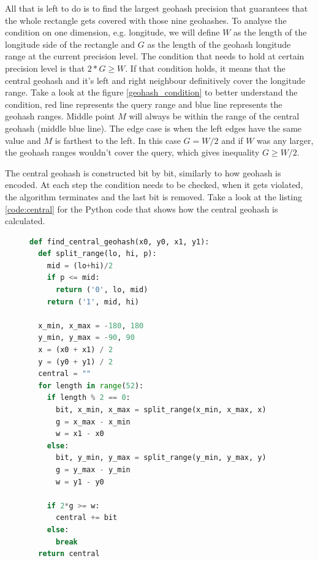\documentclass[times, utf8, diplomski]{fer}
\begin{document}
All that is left to do is to find the largest geohash precision that guarantees that the whole rectangle gets covered with those nine geohashes. To analyse the condition on one dimension, e.g. longitude, we will define $W$ as the length of the longitude side of the rectangle and $G$ as the length of the geohash longitude range at the current precision level. The condition that needs to hold at certain precision level is that $2*G \ge W$. If that condition holds, it means that the central geohash and it's left and right neighbour definitively cover the longitude range. Take a look at the figure \ref{geohash_condition} to better understand the condition, red line represents the query range and blue line represents the geohash ranges. Middle point $M$ will always be within the range of the central geohash (middle blue line). The edge case is when the left edges have the same value and $M$ is farthest to the left. In this case $G=W/2$ and if $W$ was any larger, the geohash ranges wouldn't cover the query, which gives inequality $G \ge W/2$.

The central geohash is constructed bit by bit, similarly to how geohash is encoded. At each step the condition needs to be checked, when it gets violated, the algorithm terminates and the last bit is removed. Take a look at the listing \ref{code:central} for the Python code that shows how the central geohash is calculated.

\label{code:central}
\begin{figure}[h]
\begin{lstlisting}[language=Python, caption=Finding central geohash]
def find_central_geohash(x0, y0, x1, y1):
  def split_range(lo, hi, p):
    mid = (lo+hi)/2
    if p <= mid:
      return ('0', lo, mid)
    return ('1', mid, hi)

  x_min, x_max = -180, 180
  y_min, y_max = -90, 90
  x = (x0 + x1) / 2
  y = (y0 + y1) / 2
  central = ""
  for length in range(52):
    if length % 2 == 0:
      bit, x_min, x_max = split_range(x_min, x_max, x)
      g = x_max - x_min
      w = x1 - x0
    else:
      bit, y_min, y_max = split_range(y_min, y_max, y)
      g = y_max - y_min
      w = y1 - y0

    if 2*g >= w:
      central += bit
    else:
      break
  return central
\end{lstlisting}
\end{figure}
\end{document}
